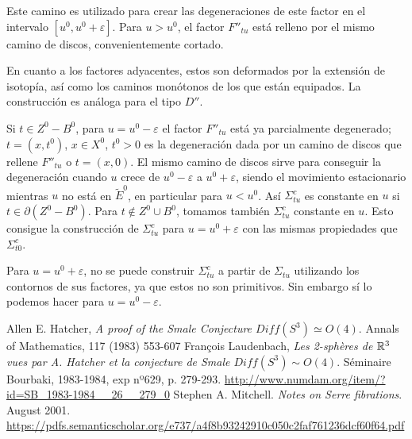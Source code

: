 \documentclass[twoside, 11pt]{article}
\begin{document}
Este camino es utilizado para crear las degeneraciones de este factor en el intervalo $[u^0,u^0+\varepsilon]$. Para $u>u^0$, el factor $F''_{tu}$ está relleno por el mismo camino de discos, convenientemente cortado. 

En cuanto a los factores adyacentes, estos son deformados por la extensión de isotopía, así como los caminos monótonos de los que están equipados. La construcción es análoga para el tipo $D''$. 

Si $t\in Z^0-B^0$, para $u=u^0-\varepsilon$ el factor $F''_{tu}$ está ya parcialmente degenerado; $t=(x,t^0)$, $x\in X^0$, $t^0>0$ es la degeneración dada por un camino de discos que rellene $F''_{tu}$ o $t=(x,0)$. El mismo camino de discos sirve para conseguir la degeneración cuando $u$ crece de $u^0-\varepsilon$ a $u^0+\varepsilon$, siendo el movimiento estacionario mientras $u$ no está en $\widetilde{E}^0$, en particular para $u<u^0$. Así $\Sigma_{tu}^c$ es constante en $u$ si $t\in \partial(Z^0-B^0)$. Para $t\notin Z^0\cup B^0$, tomamos también $\Sigma_{tu}^c$ constante en $u$. Esto consigue la construcción de $\Sigma_{tu}^c$ para $u=u^0+\varepsilon$ con las mismas propiedades que $\Sigma_{t0}^c$.

\begin{nota}
Para $u=u^0+\varepsilon$, no se puede construir $\Sigma_{tu}^c$ a partir de $\Sigma_{tu}$ utilizando los contornos de sus factores, ya que estos no son primitivos. Sin embargo sí lo podemos hacer para $u=u^0-\varepsilon$. 
\end{nota}

{}
\begin{thebibliography}{}
 Allen E. Hatcher, \emph{A proof of the Smale Conjecture $Diff(S^3)\simeq O(4)$}. Annals of Mathematics, 117 (1983) 553-607
 François Laudenbach, \emph{Les 2-sphères de $\mathbb{R}^3$ vues par A. Hatcher et la conjecture de Smale $Diff(S^3)\sim O(4)$}. Séminaire Bourbaki, 1983-1984, exp nº629, p. 279-293. \url{http://www.numdam.org/item/?id=SB_1983-1984__26__279_0}
 Stephen A. Mitchell. \emph{Notes on Serre fibrations}. August 2001. \url{https://pdfs.semanticscholar.org/e737/a4f8b93242910c050c2faf761236dcf60f64.pdf}
\end{thebibliography}
\end{document}
